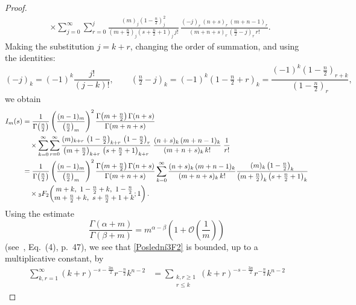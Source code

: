 \documentclass{article}
\theoremstyle{boldremark}
\renewcommand\[{\begin{equation}}
\renewcommand\]{\end{equation}}
\theoremstyle{definition}
\numberwithin{equation}{section}
\begin{document}
\begin{proof}
\begin{align*}
&\times\sum_{j=0}^{\infty}
\sum_{r=0}^{j}
\frac{(m)_j\left(1-\tfrac{n}{2}\right)_j^2}{\left(m+\tfrac{n}{2}\right)_j
\left(s+\tfrac{n}{2}+1\right)_j\, j!}
\,
\frac{(-j)_r\,(n+s)_r\,(m+n-1)_r}
{(m+n+s)_r\,\left(\tfrac{n}{2}-j\right)_r\, r!}.
\end{align*}
Making the substitution $j = k+r$, changing the order of summation, and using the identities:
\begin{equation*}
(-j)_k = (-1)^k\frac{j!}{(j-k)!},
\qquad
\left(\tfrac{n}{2}-j\right)_k
=  (-1)^k (1-\tfrac{n}{2}+r)_k=\frac{(-1)^k\left(1-\tfrac{n}{2}\right)_{r+k}}
{\left(1-\tfrac{n}{2}\right)_r},
\end{equation*}
we obtain 
\begin{align}\notag
I_m(s)&=\frac{1}{\Gamma\!\left(\tfrac{n}{2}\right)}
\left( \frac{(n-1)_m}{\left(\tfrac{n}{2}\right)_m} \right)^2
\frac{\Gamma\!\left(m + \tfrac{n}{2}\right)\Gamma(n+s)}
{\Gamma(m+n+s)}\\\label{Poslední3F2}
&\quad\times\sum_{k=0}^{\infty}\sum_{r=0}^{\infty}
\frac{(m)_{k+r}\,\left(1-\tfrac n2\right)_{k+r}\,\left(1-\tfrac n2\right)_r}
{\left(m+\tfrac n2\right)_{k+r}\,\left(s+\tfrac n2+1\right)_{k+r}}
\;
\frac{(n+s)_k\,(m+n-1)_k}{(m+n+s)_k\,k!}
\;
\frac{1}{r!}\\\notag
&=
\frac{1}{\Gamma\!\left(\tfrac{n}{2}\right)}
\left( \frac{(n-1)_m}{\left(\tfrac{n}{2}\right)_m} \right)^2
\frac{\Gamma\!\left(m + \tfrac{n}{2}\right)\Gamma(n+s)}
{\Gamma(m+n+s)}
\sum_{k=0}^{\infty}
\frac{(n+s)_k\,(m+n-1)_k}{(m+n+s)_k\,k!}
\frac{(m)_k\left(1-\tfrac n2\right)_k}{\left(m+\tfrac n2\right)_k\left(s+\tfrac n2+1\right)_k}\\\notag
&\quad\times{}_3F_2\!\left(
\begin{matrix}
m+k,\ 1-\tfrac n2+k,\ 1-\tfrac n2\\
m+\tfrac n2+k,\ s+\tfrac n2+1+k
\end{matrix}
;1\right).
\end{align}
Using the estimate
\begin{equation} \label{odhad}
\frac{\Gamma(\alpha + m)}{\Gamma(\beta + m)} = m^{\alpha - \beta}\left(1+\mathcal{O}\left(\frac{1}{m}\right)\right)
\end{equation}
(see~\cite{erdelyi1}, Eq.~(4), p.~47), we see that \eqref{Poslední3F2} is bounded, up to a multiplicative constant, by
\begin{align*}
\sum_{k,r=1}^{\infty}
(k+r)^{-s-\frac{3n}{2}} r^{-\frac n2} k^{n-2}
&=
\sum_{\substack{k,r\ge 1\\ r\le k}}
(k+r)^{-s-\frac{3n}{2}} r^{-\frac n2} k^{n-2}

\end{align*}
\end{proof}
\end{document}
